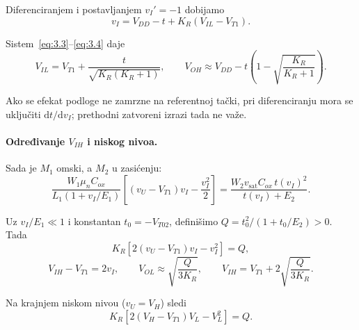 \documentclass[a4paper,11pt]{article}
\numberwithin{equation}{section}
\begin{document}
Diferenciranjem i postavljanjem $v_I'=-1$ dobijamo
\begin{equation}\label{eq:3.4}
v_I=V_{DD}-t+K_R(V_{IL}-V_{T1}).
\end{equation}

Sistem~\eqref{eq:3.3}–\eqref{eq:3.4} daje
\begin{equation}\label{eq:3.10}
V_{IL}=V_{T1}+\frac{t}{\sqrt{K_R(K_R+1)}},\qquad V_{OH}\approx V_{DD}-t\left(1-\sqrt{\frac{K_R}{K_R+1}}\right).
\end{equation}

Ako se efekat podloge ne zamrzne na referentnoj tački, pri diferenciranju mora se uključiti $\mathrm d t/\mathrm d v_I$; prethodni zatvoreni izrazi tada ne važe.
\FloatBarrier{}\paragraph{Određivanje $V_{IH}$ i niskog nivoa.}
Sada je $M_1$ omski, a $M_2$ u zasićenju:
\begin{equation}\label{eq:3.5}
\frac{W_1\mu_nC_{ox}}{L_1(1+v_I/E_1)}\left[(v_U-V_{T1})v_I-\frac{v_I^2}{2}\right]=\frac{W_2v_{\mathrm{sat}}C_{ox}\,t(v_I)^2}{t(v_I)+E_2}.
\end{equation}

Uz $v_I/E_1\ll1$ i konstantan $t_0=-V_{T02}$, definišimo $Q=t_0^2/(1+t_0/E_2)>0$. Tada
\begin{equation}\label{eq:3.6}
K_R[2(v_U-V_{T1})v_I-v_I^2]=Q,
\end{equation}
\begin{equation}\label{eq:3.7}
V_{IH}-V_{T1}=2v_I,\qquad V_{OL}\approx\sqrt{\frac{Q}{3K_R}},\qquad V_{IH}=V_{T1}+2\sqrt{\frac{Q}{3K_R}}.
\end{equation}

Na krajnjem niskom nivou ($v_U=V_H$) sledi
\begin{equation}\label{eq:3.8}
K_R[2(V_H-V_{T1})V_L-V_L^2]=Q.
\end{equation}
\end{document}

